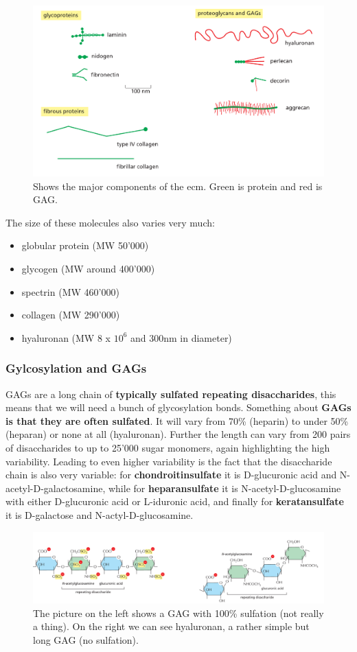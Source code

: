 \documentclass[../main.tex]{subfiles}
\begin{document}
\begin{figure}[H]
	\centering
	\includegraphics[width=0.6\linewidth]{ecm_comp}
	\caption{Shows the major components of the ecm. Green is protein and red is GAG.}
	\label{fig:ecmcomp}
\end{figure}

The size of these molecules also varies very much:
\begin{itemize}
	\item globular protein (MW 50'000)
	\item glycogen (MW around 400'000)
	\item spectrin (MW 460'000)
	\item collagen (MW 290'000)
	\item hyaluronan (MW 8 x $10^{6}$ and 300nm in diameter)
\end{itemize}

\subsubsection{Gylcosylation and GAGs}

GAGs are a long chain of \textbf{typically sulfated repeating disaccharides}, this means that we will need a bunch of glycosylation bonds. Something about \textbf{GAGs is that they are often sulfated}. It will vary from 70\% (\gls{heparin}) to under 50\% (heparan) or none at all (\gls{hyaluronan}). Further the length can vary from 200 pairs of disaccharides to up to 25'000 sugar monomers, again highlighting the high variability. Leading to even higher variability is the fact that the disaccharide chain is also very variable: for \textbf{\gls{chondroitinsulfate}} it is D-glucuronic acid and N-acetyl-D-galactosamine, while for \textbf{\gls{heparansulfate}} it is N-acetyl-D-glucosamine with either D-glucuronic acid or L-iduronic acid, and finally for \textbf{\gls{keratansulfate}} it is D-galactose and N-actyl-D-glucosamine. 


\begin{figure}[H]
	\centering
	\includegraphics[width=0.8\linewidth]{gag_sulf}
	\caption{The picture on the left shows a GAG with 100\% sulfation (not really a thing). On the right we can see hyaluronan, a rather simple but long GAG (no sulfation).}
	\label{fig:gagsulf}
\end{figure}
 
\end{document}
